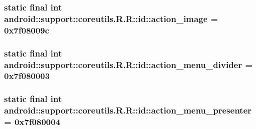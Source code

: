 \hypertarget{classandroid_1_1support_1_1coreutils_1_1_r_1_1id_e425c7c15bfe85bc78ec313a50ea2f9c}{
\subsubsection[{action\_\-image}]{\setlength{\rightskip}{0pt plus 5cm}static final int android::support::coreutils.R.R::id::action\_\-image = 0x7f08009c}}
\label{classandroid_1_1support_1_1coreutils_1_1_r_1_1id_e425c7c15bfe85bc78ec313a50ea2f9c}


\hypertarget{classandroid_1_1support_1_1coreutils_1_1_r_1_1id_321dab50ab2f083adde873fe0d6f61d9}{
\subsubsection[{action\_\-menu\_\-divider}]{\setlength{\rightskip}{0pt plus 5cm}static final int android::support::coreutils.R.R::id::action\_\-menu\_\-divider = 0x7f080003}}
\label{classandroid_1_1support_1_1coreutils_1_1_r_1_1id_321dab50ab2f083adde873fe0d6f61d9}


\hypertarget{classandroid_1_1support_1_1coreutils_1_1_r_1_1id_2bbbfc0a9d2b31f412579e88920f00b7}{
\subsubsection[{action\_\-menu\_\-presenter}]{\setlength{\rightskip}{0pt plus 5cm}static final int android::support::coreutils.R.R::id::action\_\-menu\_\-presenter = 0x7f080004}}
\label{classandroid_1_1support_1_1coreutils_1_1_r_1_1id_2bbbfc0a9d2b31f412579e88920f00b7}


